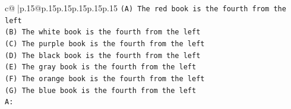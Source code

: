 \documentclass{article}
\begin{document}
{\begin{supertabular}{c@{$\;$}|p{.15\linewidth}@{}p{.15\linewidth}p{.15\linewidth}p{.15\linewidth}p{.15\linewidth}p{.15\linewidth}}
{{{\texttt{(A) The red book is the fourth from the left} \\
\texttt{(B) The white book is the fourth from the left} \\
\texttt{(C) The purple book is the fourth from the left} \\
\texttt{(D) The black book is the fourth from the left} \\
\texttt{(E) The gray book is the fourth from the left} \\
\texttt{(F) The orange book is the fourth from the left} \\
\texttt{(G) The blue book is the fourth from the left} \\
\texttt{A:} \\
            }
        }
    }
     \\ \\


\end{supertabular}}
\end{document}
